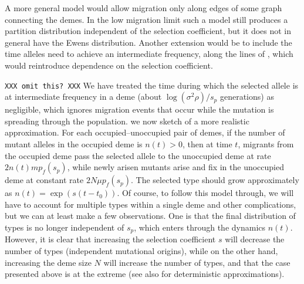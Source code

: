 \documentclass{article}
\begin{document}
A more general model would allow migration only along edges of some graph connecting the demes.
In the low migration limit such a model still produces a partition distribution independent of the selection coefficient,
but it does not in general have the Ewens distribution.
Another extension would be to include the time alleles need to achieve an intermediate frequency,
along the lines of \citet{Navarro:03}, which would reintroduce dependence on the selection coefficient.

\texttt{XXX omit this? XXX}
We have treated the time during which the selected allele is at intermediate frequency in a deme (about $\log(\sigma^2 \rho)/s_p$ generations) as negligible, 
which ignores migration events that occur while the mutation is spreading through the population. 
we now sketch of a more realistic approximation.
For each occupied--unoccupied pair of demes, if the number of mutant alleles in the occupied deme is $n(t)>0$,
then at time $t$, migrants from the occupied deme pass the selected allele to the unoccupied deme at rate $2 n(t) m p_f(s_p)$,
while newly arisen mutants arise and fix in the unoccupied deme at constant rate $2 N \mu p_f(s_p)$.
The selected type should grow approximately as $n(t)=\exp(s(t-t_0))$.
Of course, to follow this model through, we will have to account for multiple types within a single deme and other complications,
but we can at least make a few observations.
One is that the final distribution of types is no longer independent of $s_p$, which enters through the dynamics $n(t)$.
However, it is clear that increasing the selection coefficient $s$ will decrease the number of types (independent mutational origins),
while on the other hand, increasing the deme size $N$ will increase the number of types,
and that the case presented above is at the extreme (see also \cite{Navarro:03} for deterministic approximations). 
\end{document}
